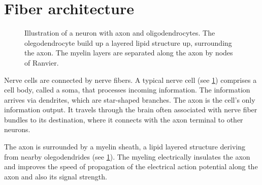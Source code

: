 \section{Fiber architecture} \label{sec:fiberArchitecture}
%
\begin{figure}[!t]
\setlength{\tikzwidth}{0.75\textwidth}
\centering
\tikzset{external/export next=false}
\caption{Illustration of a neuron with axon and oligodendrocytes. The olegodendrocyte build up a layered lipid structure up, surrounding the axon. The myelin layers are separated along the axon by nodes of Ranvier.}
\label{fig:CortexAndNerveCell}
\end{figure}
%
Nerve cells are connected by nerve fibers.
A typical nerve cell (see \cref{fig:CortexAndNerveCell}) comprises a cell body, called a soma, that processes incoming information.
The information arrives via dendrites, which are star-shaped branches.
The axon is the cell's only information output.
It travels through the brain often associated with nerve fiber bundles to its destination, where it connects with the axon terminal to other neurons.
\par
%
The axon is surrounded by a myelin sheath, a lipid layered structure deriving from nearby olegodendrides (see \cref{fig:CortexAndNerveCell}).
The myeling electrically insulates the axon and improves the speed of propagation of the electrical action potential along the axon and also its signal strength.
